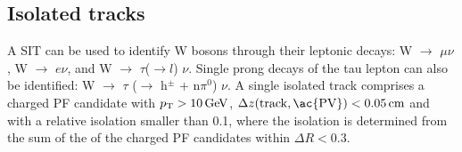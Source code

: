 %


\subsection{Isolated tracks}
\label{sec:SIT}

A \ac{SIT} can be used to identify W bosons through
their leptonic decays: W $\rightarrow$ $\mu \nu$, W $\rightarrow$
$e\nu$, and W $\rightarrow$ $\tau$($\rightarrow l$) $\nu$.  Single
prong decays of the tau lepton can also be identified: W $\rightarrow$
$\tau$ ($\rightarrow$ h$^{\pm}$ + n$\pi^{0}$) $\nu$.  A single
isolated track comprises a charged PF candidate with ${p_{\text T}} > 10 \mathrm{\,Ge\kern -0.1em V}$,
$\Delta z(\mathrm{track}, \mathrm{\ac{PV}}) < 0.05 \, \mathrm{cm}$ and with
a relative isolation smaller than 0.1, where the isolation is
determined from the sum of the \Pt of the charged PF candidates within
$\Delta R < 0.3$.


